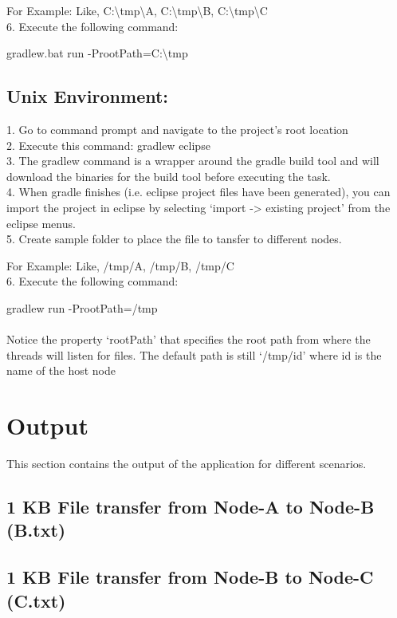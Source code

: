 \documentclass{scrartcl}
\begin{document}
For Example: Like, {C:\textbackslash tmp\textbackslash A}, {C:\textbackslash tmp\textbackslash B}, {C:\textbackslash tmp\textbackslash C}  \\
6. Execute the following command: 

gradlew.bat run -ProotPath=C:\textbackslash tmp
\subsection{Unix Environment:}
1. Go to command prompt and navigate to the project's root location \\ 
2. Execute this command: {gradlew eclipse} \\
3. The gradlew command is a wrapper around the gradle build tool and will download the binaries for the build tool before executing the task. \\
4. When gradle finishes (i.e. eclipse project files have been generated), you can import the project in eclipse by selecting ‘import -> existing project’ from the eclipse menus. \\
5. Create sample folder to place the file to tansfer to different nodes.

For Example: Like, /tmp/A,  /tmp/B,  /tmp/C \\
6. Execute the following command: 

gradlew run -ProotPath=/tmp \\ \\
Notice the property ‘rootPath’ that specifies the root path from where the threads will listen for files. The default path is still ‘/tmp/{id}’ where id is the name of the host node 

\newpage
\section{Output}
This section contains the output of the application for different scenarios. \\

\subsection{1 KB File transfer from Node-A to Node-B (B.txt)}

\newpage
\subsection{1 KB File transfer from Node-B to Node-C (C.txt)}

\newpage
\end{document}
